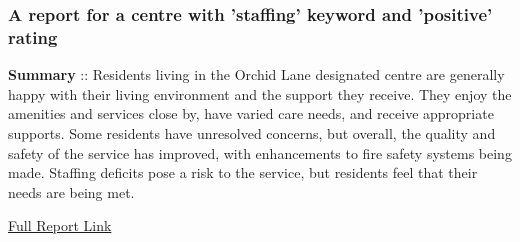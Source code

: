\documentclass[a4paper,11pt,twoside]{article}
\begin{document}
\subsubsection{A report for a centre with 'staffing' keyword and 'positive' rating}
\label{sec:orgcba7ac9}

\textbf{Summary} :: Residents living in the Orchid Lane designated centre are generally happy with their living environment and the support they receive. They enjoy the amenities and services close by, have varied care needs, and receive appropriate supports. Some residents have unresolved concerns, but overall, the quality and safety of the service has improved, with enhancements to fire safety systems being made. Staffing deficits pose a risk to the service, but residents feel that their needs are being met.

\href{https://www.hiqa.ie/system/files?file=inspectionreports/5052-orchid-lane-04-april-2023.pdf}{Full Report Link}
\end{document}

